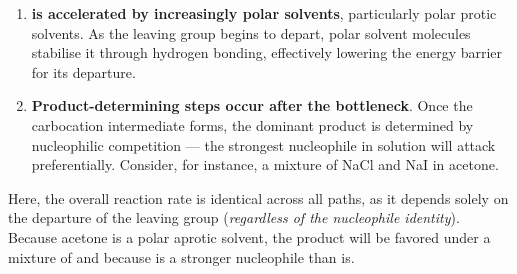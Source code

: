\documentclass[10pt]{article}
\begin{document}
\begin{core}{\sno}
\begin{enumerate}
      \item \textbf{\sno is accelerated by increasingly polar solvents}, particularly polar protic solvents. As the leaving group begins to depart, polar solvent molecules stabilise it through hydrogen bonding, effectively lowering the energy barrier for its departure.


      \item \textbf{Product-determining steps occur after the bottleneck}. Once the carbocation intermediate forms, the dominant product is determined by nucleophilic competition --- the strongest nucleophile in solution will attack preferentially. Consider, for instance, a mixture of NaCl and NaI in acetone.

    
    \end{enumerate}

    Here, the overall reaction rate is identical across all paths, as it depends solely on the departure of the leaving group (\textit{regardless of the nucleophile identity}). Because acetone is a polar aprotic solvent, the  product will be favored under a mixture of  and  because  is a stronger nucleophile than  is.

  \end{core}
\end{document}
